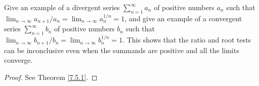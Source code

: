 \begin{exercise}\label{ex 7.5.3}
Give an example of a divergent series \(\sum_{n = 1}^\infty a_n\) of positive numbers \(a_n\) such that \(\lim_{n \to \infty} a_{n + 1} / a_n = \lim_{n \to \infty} a_n^{1 / n} = 1\), and give an example of a convergent series \(\sum_{n = 1}^\infty b_n\) of positive numbers \(b_n\) such that \(\lim_{n \to \infty} b_{n + 1} / b_n = \lim_{n \to \infty} b_n^{1 / n} = 1\).
This shows that the ratio and root tests can be inconclusive even when the summands are positive and all the limits converge.
\end{exercise}

\begin{proof}
See Theorem \ref{7.5.1}.
\end{proof}